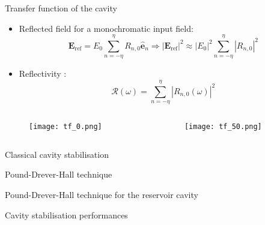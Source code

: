 \begin{frame}{Transfer function of the cavity}
	\begin{itemize}
		\item Reflected field for a monochromatic input field:
		\begin{equation*}
			\mathbf{E}_{\text{ref}} = E_0 \sum_{n=-\eta}^\eta R_{n,0} \hat{\mathbf{e}}_n \Longrightarrow |\mathbf{E}_{\text{ref}}|^2 \approx |E_0|^2 \sum_{n=-\eta}^\eta |R_{n,0} |^2
		\end{equation*}
		\item Reflectivity :
		\begin{equation*}
			\mathcal{R}(\omega) = \sum_{n=-\eta}^\eta |R_{n,0} (\omega) |^2
		\end{equation*}
	\end{itemize}
	\begin{columns}
		\begin{column}{.5\textwidth}
			\begin{figure}
				\centering
				\texttt{[image: tf\_0.png]}
			\end{figure}	
		\end{column}%
		\begin{column}{.5\textwidth}
			\begin{figure}
				\centering
				\texttt{[image: tf\_50.png]}
			\end{figure}	
		\end{column}
	\end{columns}
\end{frame}

\begin{frame}{Classical cavity stabilisation}
	
\end{frame}

\begin{frame}{Pound-Drever-Hall technique}
	
\end{frame}

\begin{frame}{Pound-Drever-Hall technique for the reservoir cavity}

\end{frame}

\begin{frame}{Cavity stabilisation performances}
	
\end{frame}

